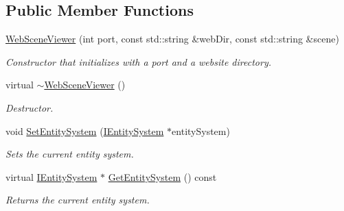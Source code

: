 \subsection*{Public Member Functions}
\begin{DoxyCompactItemize}
\item 
\mbox{\label{classentity__project_1_1WebSceneViewer_a1ea9f448e7921803aa678af7ab76ec76}} 
\hyperlink{classentity__project_1_1WebSceneViewer_a1ea9f448e7921803aa678af7ab76ec76}{Web\+Scene\+Viewer} (int port, const std\+::string \&web\+Dir, const std\+::string \&scene)
\begin{DoxyCompactList}\small\item\em Constructor that initializes with a port and a website directory. \end{DoxyCompactList}\item 
\mbox{\label{classentity__project_1_1WebSceneViewer_a56359983bd429dea6d84d9c096dab9b0}} 
virtual \hyperlink{classentity__project_1_1WebSceneViewer_a56359983bd429dea6d84d9c096dab9b0}{$\sim$\+Web\+Scene\+Viewer} ()
\begin{DoxyCompactList}\small\item\em Destructor. \end{DoxyCompactList}\item 
void \hyperlink{classentity__project_1_1WebSceneViewer_af8194e84e65c3688e934f71b1736b8fc}{Set\+Entity\+System} (\hyperlink{classentity__project_1_1IEntitySystem}{I\+Entity\+System} $\ast$entity\+System)
\begin{DoxyCompactList}\small\item\em Sets the current entity system. \end{DoxyCompactList}\item 
\mbox{\label{classentity__project_1_1WebSceneViewer_a1133bc5b5176c9ebec6edeae6b41c5bb}} 
virtual \hyperlink{classentity__project_1_1IEntitySystem}{I\+Entity\+System} $\ast$ \hyperlink{classentity__project_1_1WebSceneViewer_a1133bc5b5176c9ebec6edeae6b41c5bb}{Get\+Entity\+System} () const
\begin{DoxyCompactList}\small\item\em Returns the current entity system. \end{DoxyCompactList}\item 
\mbox{\label{classentity__project_1_1WebSceneViewer_a60b5a903167b43ff350cee71c313707b}} 

\end{DoxyCompactItemize}
